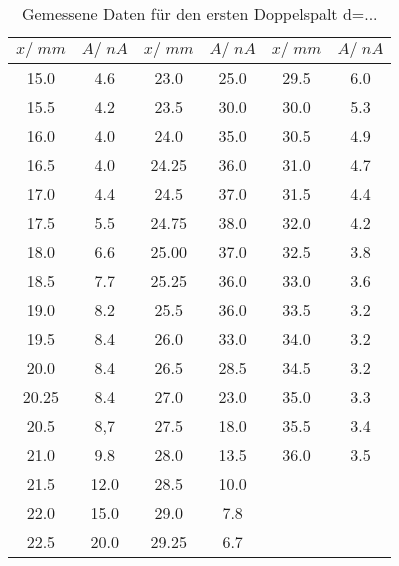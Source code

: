\begin{table}[H]
  \centering
   \begin{tabular}{S S| S S | S S}
    \toprule
    $x/\; \si{mm}$& $A/\;\si{nA}$ &
    $x/\; \si{mm}$& $A/\;\si{nA}$ &
    $x/\; \si{mm}$& $A/\;\si{nA}$ \\
    \midrule

    15.0& 4.6& 23.0& 25.0& 29.5& 6.0\\
    15.5& 4.2& 23.5& 30.0& 30.0& 5.3\\
    16.0& 4.0& 24.0& 35.0& 30.5& 4.9\\
    16.5& 4.0& 24.25& 36.0& 31.0& 4.7\\
    17.0& 4.4& 24.5& 37.0& 31.5& 4.4\\
    17.5& 5.5& 24.75& 38.0& 32.0& 4.2\\
    18.0& 6.6& 25.00& 37.0& 32.5& 3.8\\
    18.5& 7.7& 25.25& 36.0& 33.0& 3.6\\
    19.0& 8.2& 25.5& 36.0& 33.5& 3.2\\
    19.5& 8.4& 26.0& 33.0& 34.0& 3.2\\
    20.0& 8.4& 26.5& 28.5& 34.5& 3.2\\
    20.25& 8.4& 27.0& 23.0& 35.0& 3.3\\
    20.5& 8,7& 27.5& 18.0& 35.5& 3.4\\
    21.0& 9.8& 28.0& 13.5& 36.0& 3.5\\
    21.5& 12.0& 28.5& 10.0\\
    22.0& 15.0& 29.0& 7.8\\
    22.5& 20.0& 29.25& 6.7\\


   \bottomrule
  \end{tabular}
  \caption{Gemessene Daten für den ersten Doppelspalt d=...}
  \label{tab:tabelle1}
\end{table}
